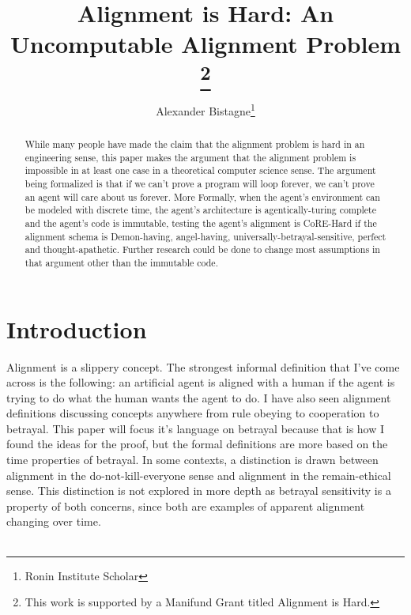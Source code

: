 \documentclass[12pt]{article}
\begin{document}
\title{Alignment is Hard: An Uncomputable Alignment Problem \footnote{This work is supported by a Manifund Grant titled Alignment is Hard.}}

\author{Alexander Bistagne\footnote{Ronin Institute Scholar}}

\maketitle

\begin{abstract}
  	While many people have made the claim that the alignment problem is hard in an engineering sense, this paper makes the argument that the alignment problem is impossible in at least one case in a theoretical computer science sense. The argument being formalized is that if we can't prove a program will loop forever, we can't prove an agent will care about us forever. More Formally, when the agent's environment can be modeled with discrete time, the agent's architecture is agentically-turing complete and the agent's code is immutable, testing the agent's alignment is CoRE-Hard if the alignment schema is Demon-having, angel-having, universally-betrayal-sensitive, perfect and thought-apathetic. Further research could be done to change most assumptions in that argument other than the immutable code. 
\end{abstract}


\section{Introduction}

Alignment is a slippery concept. The strongest informal definition  that I've come across is the following: an artificial agent is aligned with a human if the agent is trying to do what the human wants the agent to do\cite{Clarification}. I have also seen alignment definitions discussing concepts anywhere from rule obeying to cooperation to betrayal. This paper will focus it's language on betrayal because that is how I found the ideas for the proof, but the formal definitions are more based on the time properties of betrayal. In some contexts, a distinction is drawn between alignment in the do-not-kill-everyone sense and alignment in the remain-ethical sense. This distinction is not explored in more depth as betrayal sensitivity is a property of both concerns, since both are examples of apparent alignment changing over time. \\ \\
\end{document}
